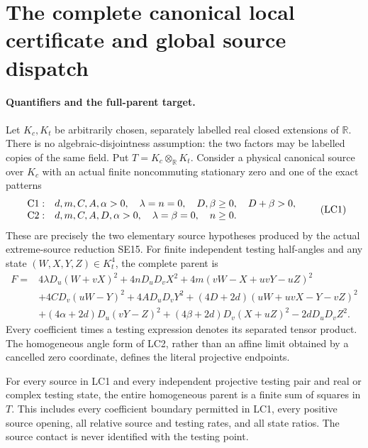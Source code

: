 \section{The complete canonical local certificate and global source dispatch}
\label{sec:complete-source-routing}

\paragraph{Quantifiers and the full-parent target.}
Let \(K_c,K_t\) be arbitrarily chosen, separately labelled real closed
extensions of \(\mathbb R\).  There is no algebraic-disjointness
assumption: the two factors may be labelled copies of the same field.
Put \(T=K_c\otimes_{\mathbb R}K_t\).
Consider a physical canonical source over \(K_c\) with an actual
finite noncommuting stationary zero and one of the exact patterns
\[
\begin{array}{ll}
{\rm C1}:&d,m,C,A,\alpha>0,\quad\lambda=n=0,\quad
             D,\beta\geq0,\quad D+\beta>0,\\
{\rm C2}:&d,m,C,A,D,\alpha>0,\quad\lambda=\beta=0,\quad n\geq0.
\end{array}\tag{LC1}
\]
These are precisely the two elementary source hypotheses produced
by the actual extreme-source reduction SE15.  For finite independent
testing half-angles and any state \((W,X,Y,Z)\in K_t^4\), the complete
parent is
\[
\begin{split}
 F={}&4\lambda D_u(W+vX)^2+4nD_uD_vX^2
       +4m(vW-X+uvY-uZ)^2\\
 &+4CD_v(uW-Y)^2+4AD_uD_vY^2
       +(4D+2d)(uW+uvX-Y-vZ)^2\\
 &+(4\alpha+2d)D_u(vY-Z)^2
       +(4\beta+2d)D_v(X+uZ)^2-2dD_uD_vZ^2 .
\end{split}\tag{LC2}
\]
Every coefficient times a testing expression denotes its separated
tensor product.  The homogeneous angle form of LC2, rather than
an affine limit obtained by a cancelled zero coordinate, defines
the literal projective endpoints.

\begin{theorem}
For every source in LC1 and every independent projective testing pair
and real or complex testing state, the entire homogeneous parent is
a finite sum of squares in \(T\).
This includes every coefficient boundary permitted in LC1, every
positive source opening, all relative source and testing rates, and
all state ratios.  The source contact is never identified with the
testing point.
\end{theorem}

